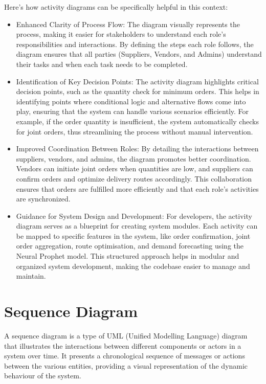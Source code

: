 Here’s how activity diagrams can be specifically helpful in this context:
\begin{itemize}
    \item Enhanced Clarity of Process Flow: The diagram visually represents the process, making it easier for stakeholders to understand each role's responsibilities and interactions. By defining the steps each role follows, the diagram ensures that all parties (Suppliers, Vendors, and Admins) understand their tasks and when each task needs to be completed.
    \item Identification of Key Decision Points: The activity diagram highlights critical decision points, such as the quantity check for minimum orders. This helps in identifying points where conditional logic and alternative flows come into play, ensuring that the system can handle various scenarios efficiently. For example, if the order quantity is insufficient, the system automatically checks for joint orders, thus streamlining the process without manual intervention.
    \item Improved Coordination Between Roles: By detailing the interactions between suppliers, vendors, and admins, the diagram promotes better coordination. Vendors can initiate joint orders when quantities are low, and suppliers can confirm orders and optimize delivery routes accordingly. This collaboration ensures that orders are fulfilled more efficiently and that each role's activities are synchronized.
    \item Guidance for System Design and Development: For developers, the activity diagram serves as a blueprint for creating system modules. Each activity can be mapped to specific features in the system, like order confirmation, joint order aggregation, route optimisation, and demand forecasting using the Neural Prophet model. This structured approach helps in modular and organized system development, making the codebase easier to manage and maintain.
\end{itemize}
\section{Sequence Diagram}

A sequence diagram is a type of UML (Unified Modelling Language) diagram that illustrates the interactions between different components or actors in a system over time. It presents a chronological sequence of messages or actions between the various entities, providing a visual representation of the dynamic behaviour of the system.

